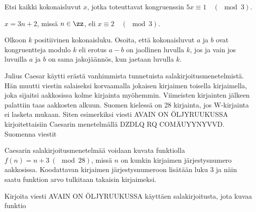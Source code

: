 \begin{tehtavasivu}
\begin{tehtava}
	Etsi kaikki kokonaisluvut $x$, jotka toteuttavat kongruenssin $5x\equiv 1 \quad (\mod 3)$.
	\begin{vastaus}
	$x = 3n + 2$, missä $n \in \zz$, eli $x\equiv 2 \quad (\mod 3)$.
	\end{vastaus}
\end{tehtava}

\begin{tehtava}
	Olkoon $k$ positiivinen kokonaisluku. Osoita, että kokonaisluvut $a$ ja $b$ ovat kongruentteja modulo $k$ eli erotus $a-b$ on jaollinen luvulla $k$, jos ja vain jos luvuilla $a$ ja $b$ on sama jakojäännös, kun jaetaan luvulla $k$.
\end{tehtava}

\begin{tehtava}
	Julius Caesar käytti erästä vanhimmista tunnetuista salakirjoitusmenetelmistä. Hän muutti viestin salaiseksi korvaamalla jokaisen kirjaimen toisella kirjaimella, joka sijaitsi aakkosissa kolme kirjainta myöhemmin. Viimeisten kirjainten jälkeen palattiin taas aakkosten alkuun. Suomen kielessä on 28 kirjainta, jos W-kirjainta ei lasketa mukaan. Siten esimerkiksi viesti AVAIN ON ÖLJYRUUKUSSA kirjoitettaisiin Caesarin menetelmällä DZDLQ RQ COMÄUYYNYVVD. Suomenna viestit 
	\begin{vastaus}
	\end{vastaus}
\end{tehtava}

\begin{tehtava}
	Caesarin salakirjoitusmenetelmää voidaan kuvata funktiolla $f(n) = n + 3 \ (\mod 28)$, missä $n$ on kunkin kirjaimen järjestysnumero aakkosissa. Koodattavan kirjaimen järjestysnumeroon lisätään luku $3$ ja näin saatu funktion arvo tulkitaan takaisin kirjaimeksi.

	Kirjoita viesti AVAIN ON ÖLJYRUUKUSSA käyttäen salakirjoitusta, jota kuvaa funktio 
\end{tehtava}

\end{tehtavasivu}



